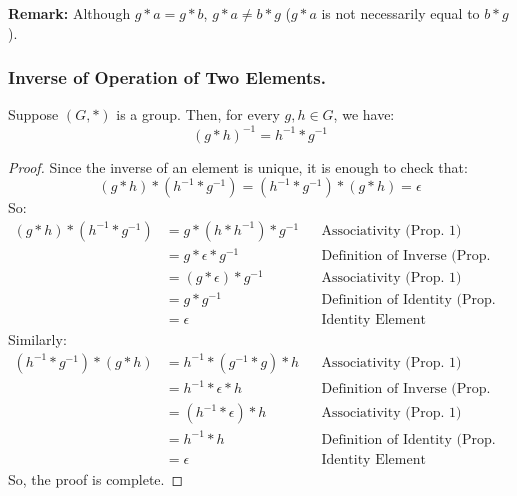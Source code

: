 \documentclass[letterpaper]{article}
\begin{document}
\textbf{Remark:} Although $g * a = g * b$, $g * a \neq b * g$ ($g * a$ is not necessarily equal to $b * g$). 

\subsubsection{Inverse of Operation of Two Elements.}

\begin{lemma}{}{}
    Suppose $(G, *)$ is a group. Then, for every $g, h \in G$, we have: 
    \[(g * h)^{-1} = h^{-1} * g^{-1}\]
\end{lemma}

\begin{mdframed}
    \begin{proof}
        Since the inverse of an element is unique, it is enough to check that: 
        \[(g * h) * (h^{-1} * g^{-1}) = (h^{-1} * g^{-1}) * (g * h) = \epsilon\]
        So: 
        \begin{equation*}
            \begin{aligned}
                (g * h) * (h^{-1} * g^{-1}) &= g * (h * h^{-1}) * g^{-1} && \text{Associativity (Prop. 1)} \\ 
                    &= g * \epsilon * g^{-1} && \text{Definition of Inverse (Prop. 3)} \\ 
                    &= (g * \epsilon) * g^{-1} && \text{Associativity (Prop. 1)} \\ 
                    &= g * g^{-1} && \text{Definition of Identity (Prop. 2)} \\ 
                    &= \epsilon && \text{Identity Element}
            \end{aligned}
        \end{equation*}
        Similarly: 
        \begin{equation*}
            \begin{aligned}
                (h^{-1} * g^{-1}) * (g * h) &= h^{-1} * (g^{-1} * g) * h && \text{Associativity (Prop. 1)} \\ 
                    &= h^{-1} * \epsilon * h && \text{Definition of Inverse (Prop. 3)} \\ 
                    &= (h^{-1} * \epsilon) * h && \text{Associativity (Prop. 1)} \\ 
                    &= h^{-1} * h && \text{Definition of Identity (Prop. 2)} \\ 
                    &= \epsilon && \text{Identity Element}
            \end{aligned}
        \end{equation*}
        So, the proof is complete. 
    \end{proof}
\end{mdframed}
\end{document}
